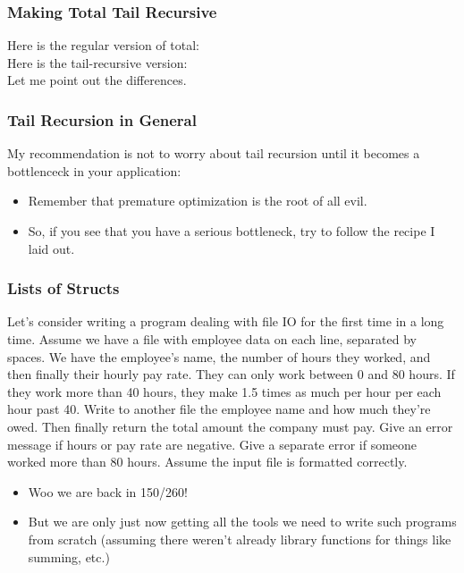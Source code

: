 \documentclass{beamer}
\begin{document}


\begin{frame}
  \frametitle{Making Total Tail Recursive}
  Here is the regular version of total:
  \totalReg \\
  \pause
  Here is the tail-recursive version:
  \totalTail \\
  \pause
  Let me point out the differences.
\end{frame}

\begin{frame}
  \frametitle{Tail Recursion in General}
  My recommendation is not to worry about tail recursion until it becomes a bottlenceck in your application:
  \begin{itemize}
  \item<2-> Remember that premature optimization is the root of all evil.
  \item<3-> So, if you see that you have a serious bottleneck, try to follow the recipe I laid out.
  \end{itemize}
\end{frame}

\begin{frame}
  \frametitle{Lists of Structs}
  Let's consider writing a program dealing with file IO for the first time in a long time. Assume we have a file with employee data on each line, separated by spaces. We have the
  employee's name, the number of hours they worked, and then finally their hourly pay rate. They can only work between 0 and 80 hours. If they work more than 40 hours, they make 1.5 times as much per hour per each hour past 40. Write to another
  file the employee name and how much they're owed. Then finally return the total
  amount the company must pay. Give an error message if hours or pay rate are negative. Give a separate error if someone worked more than 80 hours. Assume the input file is formatted correctly. 
  \begin{itemize}
  \item<2-> Woo we are back in 150/260!
  \item<3-> But we are only just now getting all the tools we need to write
    such programs from scratch (assuming there weren't already library functions for things like summing, etc.)
  \end{itemize}
\end{frame}
\end{document}
